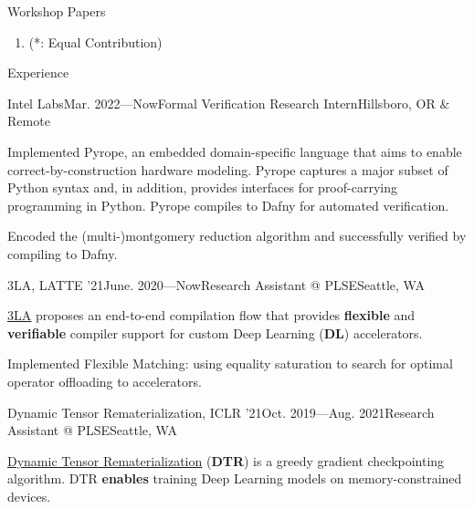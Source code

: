 \documentclass{resume}
\newcommand{\myul}[2][blue]{\setulcolor{#1}\ul{#2}\setulcolor{blue}}
\begin{document}
	\vspace{1pt}
	\begin{rSection}{Workshop Papers}
		\begin{enumerate}
			\setlength{\itemsep}{1pt}
            \setlength{\parskip}{0pt}
			\setlength{\parsep}{0pt}
			\item {} (\small{*: Equal Contribution})
		\end{enumerate}
        \vspace{-5pt}
	\end{rSection}
    \vspace{1pt}

    \begin{rSection}{Experience}
		\begin{rSubsection}{Intel Labs}{Mar. 2022---Now}{Formal Verification Research Intern}{Hillsboro, OR \& Remote}
			\item Implemented Pyrope, an embedded domain-specific language that aims to enable correct-by-construction hardware modeling. Pyrope captures a major subset of Python syntax and, in addition, provides interfaces for proof-carrying programming in Python. Pyrope compiles to Dafny for automated verification.
            \item Encoded the (multi-)montgomery reduction algorithm and successfully verified by compiling to Dafny.
		\end{rSubsection}
		\vspace{-5pt}
        \begin{rSubsection}{3LA, LATTE '21}{June. 2020---Now}{Research Assistant @ PLSE}{Seattle, WA}
            \item \href{https://capra.cs.cornell.edu/latte21/paper/30.pdf}{\color{blue} \myul{3LA}} proposes an end-to-end compilation flow that provides \textbf{flexible} and \textbf{verifiable} compiler support for custom Deep Learning (\textbf{DL}) accelerators.
            \item Implemented Flexible Matching: using equality saturation to search for optimal operator offloading to accelerators.
        \end{rSubsection}
        \vspace{-5pt}
        \begin{rSubsection}{Dynamic Tensor Rematerialization, ICLR '21}{Oct. 2019---Aug. 2021}{Research Assistant @ PLSE}{Seattle, WA}
            \item \href{https://github.com/uwsampl/dtr-prototype}{\color{blue} \myul{Dynamic Tensor Rematerialization}} (\textbf{DTR}) is a greedy gradient checkpointing algorithm. DTR \textbf{enables} training Deep Learning models on memory-constrained devices.

\end{rSubsection}
\end{rSection}
\end{document}
